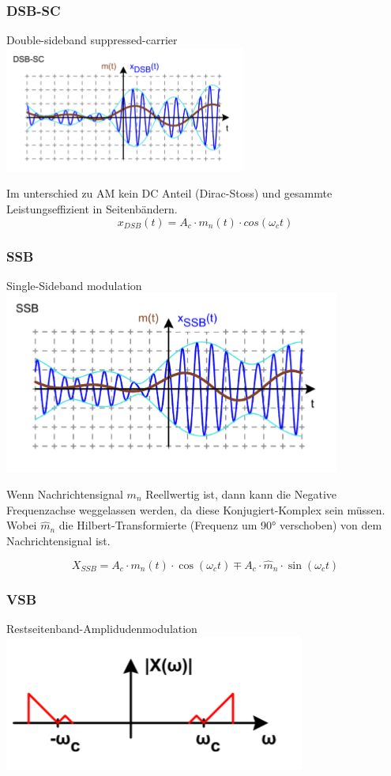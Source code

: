 \subsubsection{DSB-SC}
Double-sideband suppressed-carrier\\

\includegraphics[width=0.5\columnwidth]{Images/dsb_sc}

Im unterschied zu AM kein DC Anteil (Dirac-Stoss) und gesammte Leistungseffizient in Seitenbändern.
\[x_{DSB}(t) = A_c \cdot m_n(t) \cdot cos(\omega_ct)\]

\subsubsection{SSB}
Single-Sideband modulation\\
\includegraphics[width=0.5\columnwidth]{Images/ssb}

Wenn Nachrichtensignal $m_n$ Reellwertig ist, dann kann die Negative Frequenzachse weggelassen werden, da diese Konjugiert-Komplex sein müssen. Wobei $\hat{m}_n$ die Hilbert-Transformierte (Frequenz um 90° verschoben) von dem Nachrichtensignal ist.

\[X_{SSB} = A_c \cdot m_n(t) \cdot \cos(\omega_ct) \mp A_c\cdot \hat{m}_n\cdot \sin(\omega_ct)\]

\subsubsection{VSB}
Restseitenband-Amplidudenmodulation\\
\includegraphics[width=0.5\columnwidth]{Images/vsb}

